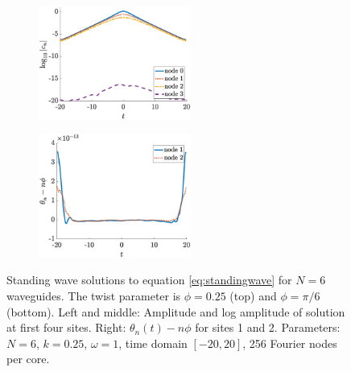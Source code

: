 \documentclass[11pt,reqno]{amsart}
\begin{document}
\begin{figure}
\begin{subfigure}{0.3\linewidth}
    \end{subfigure}
    \begin{subfigure}{0.3\linewidth}
        \caption{}
        \label{fig:m6pi6logamp}
        \includegraphics[width=5cm]{m6phipi6logamp.eps}
    \end{subfigure}
        \begin{subfigure}{0.3\linewidth}
        \caption{}
        \label{fig:m6pi6phase}
        \includegraphics[width=5cm]{m6phipi6phase.eps}
    \end{subfigure}
    \caption{Standing wave solutions to equation \cref{eq:standingwave} for $N=6$ waveguides. The twist parameter is $\phi = 0.25$ (top) and $\phi = \pi/6$ (bottom). Left and middle: Amplitude and log amplitude of solution at first four sites. Right: $\theta_n(t) - n \phi$ for sites 1 and 2. Parameters: $N=6$, $k=0.25$, $\omega=1$, time domain $[-20,20]$, 256 Fourier nodes per core.}
    \label{fig:m6sol}
\end{figure}
\end{document}

